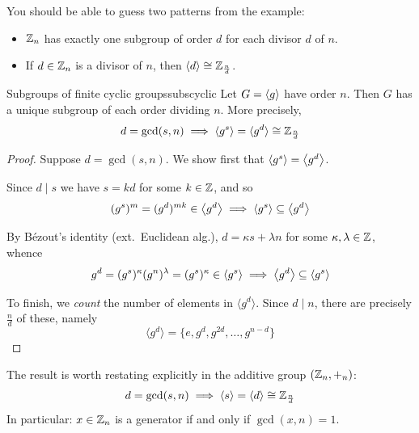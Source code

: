 You should be able to guess two patterns from the example:
\begin{itemize}
	\item $\mathbb{Z}_n$ has exactly one subgroup of order $d$ for each divisor $d$ of $n$.
	\item If $d\in\mathbb{Z}_n$ is a divisor of $n$, then $\left\langle d\right\rangle\cong \mathbb{Z}_{\frac nd}$.
\end{itemize}

\begin{cor}{Subgroups of finite cyclic groups}{subscyclic}
Let $G=\left\langle g\right\rangle$ have order $n$. Then $G$ has a unique subgroup of each order dividing $n$. More precisely, 
\[d=\gcd(s,n)\implies \left\langle g^s\right\rangle=\langle{g^d}\rangle\cong \mathbb{Z}_{\frac nd}\]
\end{cor}

\goodbreak

\begin{proof}
Suppose $d=\gcd(s,n)$. We show first that $\left\langle g^s\right\rangle=\left\langle g^d\right\rangle$.
\begin{description}\itemsep0pt
	\item[$\bigl(\ip{g^s}\subseteq\ip{g^d}\bigr)$] Since $d\!\mid\!s$ we have $s=kd$ for some $k\in\mathbb{Z}$, and so
	\[(g^s)^m=(g^d)^{mk}\in\bigl\langle g^d\big\rangle \implies \left\langle g^s\right\rangle\subseteq\bigl\langle g^d\big\rangle\]
	\item[$\bigl(\ip{g^s}\supseteq \ip{g^d}\bigr)$] By Bézout's identity (ext.\ Euclidean alg.), $d=\kappa s+\lambda n$ for some $\kappa,\lambda\in\mathbb{Z}$, whence
	\[g^d=(g^s)^\kappa (g^n)^\lambda=(g^s)^\kappa\in\left\langle g^s\right\rangle \implies \bigl\langle g^d\big\rangle\subseteq\left\langle g^s\right\rangle\]
\end{description}
To finish, we \emph{count} the number of elements in $\langle{g^d}\rangle$. Since $d\!\mid\!n$, there are precisely $\frac nd$ of these, namely
\[\langle{g^d}\rangle=\bigl\{e,g^d,g^{2d},\ldots,g^{n-d}\bigr\}\tag*{\qedhere}\]
\end{proof}


The result is worth restating explicitly in the additive group $(\mathbb{Z}_n,+_n)$:
\[d=\gcd(s,n)\implies \left\langle s\right\rangle=\left\langle d\right\rangle\cong\mathbb{Z}_{\frac nd}\]
In particular: $x\in \mathbb{Z}_n$ is a generator if and only if $\gcd(x,n)=1$.


